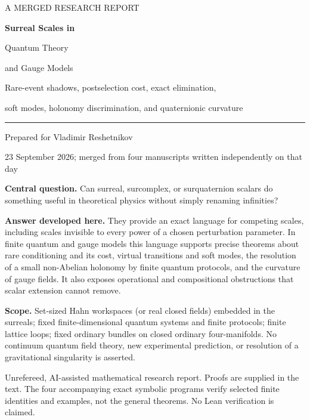 \documentclass[11pt,oneside]{article}
\numberwithin{equation}{section}
\theoremstyle{plain}
\theoremstyle{definition}
\theoremstyle{remark}
\begin{document}
\hypersetup{pageanchor=false}
\begin{titlepage}
\color{ink}
\vspace*{10mm}
{\small\sffamily A MERGED RESEARCH REPORT\par}
\vspace{9mm}
{\Huge\bfseries Surreal Scales in\par Quantum Theory\par and Gauge Models\par}
\vspace{8mm}
{\Large Rare-event shadows, postselection cost, exact elimination,\par
soft modes, holonomy discrimination, and quaternionic curvature\par}
\vspace{11mm}
\noindent\rule{\textwidth}{0.7pt}
\vspace{4mm}
{\large Prepared for Vladimir Reshetnikov\par}
{\normalsize 23 September 2026; merged from four manuscripts written independently on that day\par}
\vspace{9mm}
\noindent\begin{minipage}{0.94\textwidth}
\textbf{Central question.} Can surreal, surcomplex, or surquaternion scalars do something useful in theoretical physics without simply renaming infinities?

\medskip
\textbf{Answer developed here.} They provide an exact language for competing scales, including scales invisible to every power of a chosen perturbation parameter. In finite quantum and gauge models this language supports precise theorems about rare conditioning and its cost, virtual transitions and soft modes, the resolution of a small non-Abelian holonomy by finite quantum protocols, and the curvature of gauge fields. It also exposes operational and compositional obstructions that scalar extension cannot remove.

\medskip
\textbf{Scope.} Set-sized Hahn workspaces (or real closed fields) embedded in the surreals; fixed finite-dimensional quantum systems and finite protocols; finite lattice loops; fixed ordinary bundles on closed ordinary four-manifolds. No continuum quantum field theory, new experimental prediction, or resolution of a gravitational singularity is asserted.
\end{minipage}
\vfill
{\small\color{muted}Unrefereed, AI-assisted mathematical research report. Proofs are supplied in the text. The four accompanying exact symbolic programs verify selected finite identities and examples, not the general theorems. No Lean verification is claimed.\par}
\end{titlepage}
\hypersetup{pageanchor=true}
\end{document}
